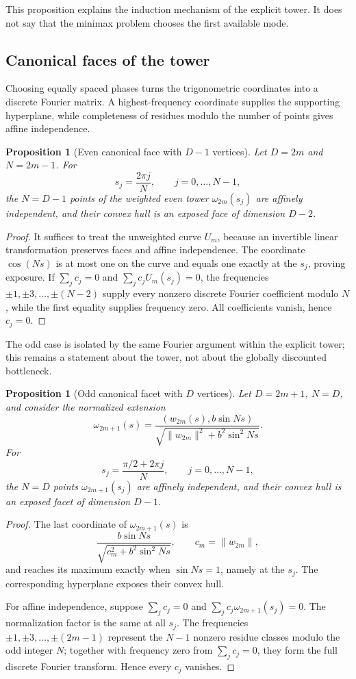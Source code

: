 \documentclass[10pt,a4paper]{article}
\theoremstyle{plain}
\newtheorem{proposition}[theorem]{Proposition}
\theoremstyle{definition}
\theoremstyle{remark}
\begin{document}
This proposition explains the induction mechanism of the explicit tower. It does not say that the minimax problem chooses the first available mode.

\subsection{Canonical faces of the tower}

Choosing equally spaced phases turns the trigonometric coordinates into a discrete Fourier matrix. A highest-frequency coordinate supplies the supporting hyperplane, while completeness of residues modulo the number of points gives affine independence.

\begin{proposition}[Even canonical face with $D-1$ vertices]
Let $D=2m$ and $N=2m-1$. For
\[
  s_j=\frac{2\pi j}{N},
  \qquad j=0,\ldots,N-1,
\]
the $N=D-1$ points of the weighted even tower $\omega_{2m}(s_j)$ are affinely independent, and their convex hull is an exposed face of dimension $D-2$.
\end{proposition}

\begin{proof}
It suffices to treat the unweighted curve $U_m$, because an invertible linear transformation preserves faces and affine independence. The coordinate $\cos(Ns)$ is at most one on the curve and equals one exactly at the $s_j$, proving exposure. If $\sum_jc_j=0$ and $\sum_jc_jU_m(s_j)=0$, the frequencies $\pm1,\pm3,\ldots,\pm(N-2)$ supply every nonzero discrete Fourier coefficient modulo $N$, while the first equality supplies frequency zero. All coefficients vanish, hence $c_j=0$.
\end{proof}

The odd case is isolated by the same Fourier argument within the explicit tower; this remains a statement about the tower, not about the globally discounted bottleneck.

\begin{proposition}[Odd canonical facet with $D$ vertices]
Let $D=2m+1$, $N=D$, and consider the normalized extension
\[
  \omega_{2m+1}(s)
  =\frac{(w_{2m}(s),b\sin Ns)}{\sqrt{\|w_{2m}\|^2+b^2\sin^2Ns}}.
\]
For
\[
  s_j=\frac{\pi/2+2\pi j}{N},
  \qquad j=0,\ldots,N-1,
\]
the $N=D$ points $\omega_{2m+1}(s_j)$ are affinely independent, and their convex hull is an exposed facet of dimension $D-1$.
\end{proposition}


\begin{proof}
The last coordinate of $\omega_{2m+1}(s)$ is
\[
  \frac{b\sin Ns}{\sqrt{c_m^2+b^2\sin^2Ns}},
  \qquad c_m=\|w_{2m}\|,
\]
and reaches its maximum exactly when $\sin Ns=1$, namely at the $s_j$. The corresponding hyperplane exposes their convex hull.

For affine independence, suppose $\sum_jc_j=0$ and $\sum_jc_j\omega_{2m+1}(s_j)=0$. The normalization factor is the same at all $s_j$. The frequencies $\pm1,\pm3,\ldots,\pm(2m-1)$ represent the $N-1$ nonzero residue classes modulo the odd integer $N$; together with frequency zero from $\sum_jc_j=0$, they form the full discrete Fourier transform. Hence every $c_j$ vanishes.
\end{proof}
\end{document}
